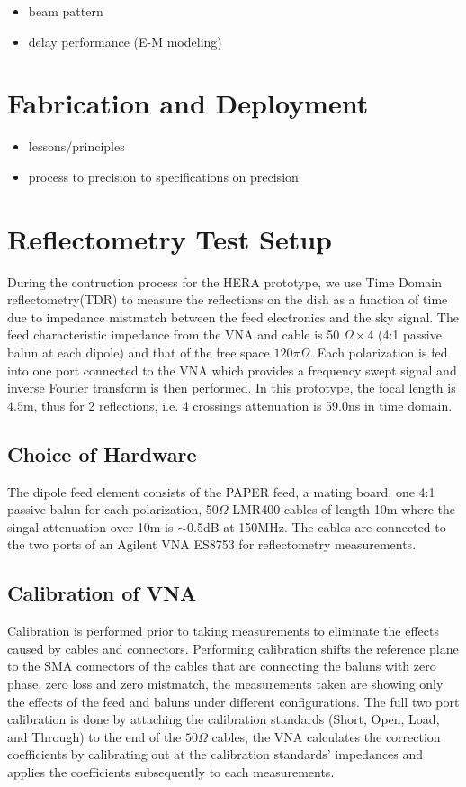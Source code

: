 \documentclass[preprint]{aastex}  %
\begin{document}
\begin{itemize}
\item beam pattern
\item delay performance (E-M modeling)
\end{itemize}

\section{Fabrication and Deployment}
\label{sec:deploy}

\begin{itemize}
\item lessons/principles
\item process to precision to specifications on precision
\end{itemize}


\section{Reflectometry Test Setup}
\label{sec:reflect}
During the contruction process for the HERA prototype, we use Time Domain reflectometry(TDR) to measure the reflections on the dish as a function of time due to impedance mistmatch between the feed electronics and the sky signal. The feed characteristic impedance from the VNA and cable is 50 $\Omega\times 4$ (4:1 passive balun at each dipole) and that of the free space $120\pi\Omega$. Each polarization is fed into one port connected to the VNA which provides a frequency swept signal and inverse Fourier transform is then performed.  In this prototype, the focal length is $4.5$m, thus for 2 reflections, i.e. 4 crossings attenuation is 59.0ns in time domain.


\subsection{Choice of Hardware}
The dipole feed element consists of the PAPER feed, a mating board, one 4:1 passive balun for each polarization, 50$\Omega$ LMR400 cables of length 10m where the singal attenuation over 10m is $\sim$0.5dB at 150MHz. 
The cables are connected to the two ports of an Agilent VNA ES8753 for reflectometry measurements. 


\subsection{Calibration of VNA}
Calibration is performed prior to taking measurements to eliminate the effects caused by cables and connectors. Performing calibration shifts the reference plane to the SMA connectors of the cables that are connecting the baluns with zero phase, zero loss and zero mistmatch, the measurements taken are showing only the effects of the feed and baluns under different configurations. The full two port calibration is done by attaching the calibration standards (Short, Open, Load, and Through) to the end of the $50\Omega$ cables, the VNA calculates the correction coefficients by calibrating out at the calibration standards' impedances and applies the coefficients subsequently to each measurements.
\end{document}
